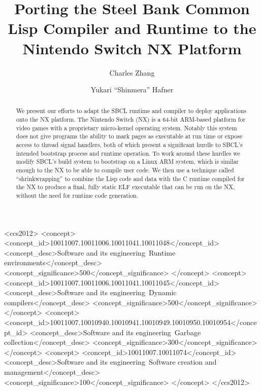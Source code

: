 \documentclass[format=sigconf]{acmart}
\begin{document}
\title{Porting the Steel Bank Common Lisp Compiler and Runtime to the Nintendo Switch NX Platform}

\author{Charles Zhang}
\author{Yukari ``Shinmera'' Hafner}

\begin{CCSXML}
<ccs2012>
   <concept>
       <concept_id>10011007.10011006.10011041.10011048</concept_id>
       <concept_desc>Software and its engineering~Runtime environments</concept_desc>
       <concept_significance>500</concept_significance>
       </concept>
   <concept>
       <concept_id>10011007.10011006.10011041.10011045</concept_id>
       <concept_desc>Software and its engineering~Dynamic compilers</concept_desc>
       <concept_significance>500</concept_significance>
       </concept>
   <concept>
       <concept_id>10011007.10010940.10010941.10010949.10010950.10010954</concept_id>
       <concept_desc>Software and its engineering~Garbage collection</concept_desc>
       <concept_significance>300</concept_significance>
       </concept>
   <concept>
       <concept_id>10011007.10011074</concept_id>
       <concept_desc>Software and its engineering~Software creation and management</concept_desc>
       <concept_significance>100</concept_significance>
       </concept>
 </ccs2012>
\end{CCSXML}


\begin{abstract}
  We present our efforts to adapt the SBCL runtime and compiler to deploy applications onto the NX platform. The Nintendo Switch (NX) is a 64-bit ARM-based platform for video games with a proprietary micro-kernel operating system. Notably this system does not give programs the ability to mark pages as executable at run time or expose access to thread signal handlers, both of which present a significant hurdle to SBCL's intended bootstrap process and runtime operation. To work around these hurdles we modify SBCL's build system to bootstrap on a Linux ARM system, which is similar enough to the NX to be able to compile user code. We then use a technique called ``shrinkwrapping'' to combine the Lisp code and data with the C runtime compiled for the NX to produce a final, fully static ELF executable that can be run on the NX, without the need for runtime code generation.
\end{abstract}
\end{document}
